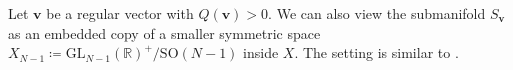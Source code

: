 \documentclass[a4paper,11pt]{amsart} %
\newcommand{\8}{\infty}
\newcommand{\id}{\mathbf{1}}
\newcommand{\vbf}{\mathbf{v}}
\newcommand{\SO}{\mathrm{SO}}
\newcommand{\GL}{\mathrm{GL}}
\newcommand{\R}{\mathbb{R}}
\newcommand{\tr}{\mathrm{tr}}
\newcommand\restr[2]{{%
  \left.\kern-\nulldelimiterspace %
  #1 %
  \vphantom{\big|} %
  \right|_{#2} %
  }}
\theoremstyle{mytheoremstyle}
\newtheorem{prop}[thm]{Proposition}
\theoremstyle{remark}
\numberwithin{equation}{section}
\begin{document}

Let $\vbf$ be a regular vector with $Q(\vbf)>0$. We can also view the submanifold $S_\vbf$ as an embedded copy of a smaller symmetric space $X_{N-1} \coloneqq \GL_{N-1}(\R)^+/\SO(N-1)$ inside $X$. The setting is similar to \cite{modsymb, schmidt}.
\end{document}

